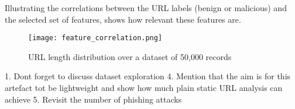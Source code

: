 	Illustrating the correlations between the URL labels (benign or malicious) and the selected set of features, shows how relevant these features are.

	\begin{figure}[b]
		\centering
		\texttt{[image: feature\_correlation.png]}
		\caption{URL length distribution over a dataset of 50,000 records}
		\label{fig:FEATURE_CORRELATION}
	\end{figure}





	1. Dont forget to discuss dataset exploration
	4. Mention that the aim is for this artefact tot be lightweight and show how much plain static URL analysis can achieve
	5. Revisit the number of phishing attacks

\fi
